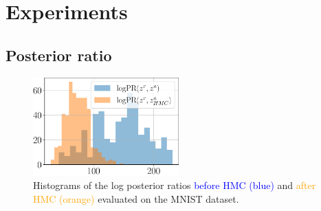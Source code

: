 
\section{Experiments} \label{sec:experiments}
\subsection{Posterior ratio}\label{sec:exp_ratio}

\begin{figure}
	\centering
	\includegraphics[width=0.5\textwidth]{pics/3_adv_att/mnist_posterior_ratio.pdf}
	\caption{Histograms of the log posterior ratios \textcolor{blue}{before HMC (blue)} and \textcolor{orange}{after HMC (orange)} evaluated on the MNIST dataset.}
	\label{fig:mnist_post_ratio_main}
\end{figure}

